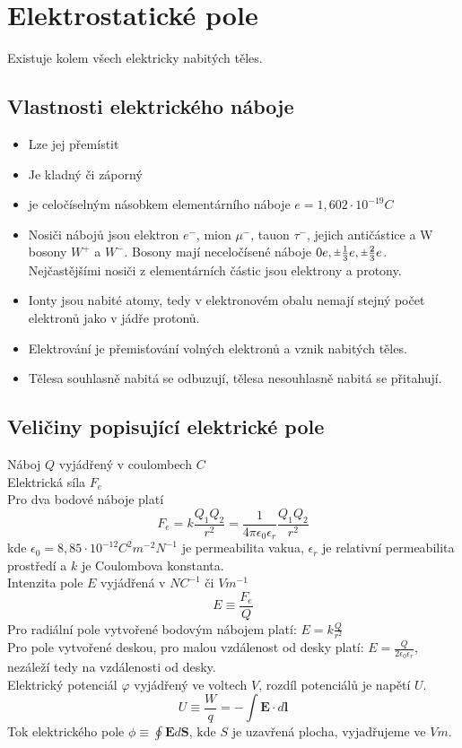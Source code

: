 \documentclass[titlepage]{book}
\newcommand{\rpm}{\sbox0{$1$}\sbox2{$\scriptstyle\pm$}
  \raise\dimexpr(\ht0-\ht2)/2\relax\box2 }
\begin{document}
\chapter{Elektrostatické pole}
Existuje kolem všech elektricky nabitých těles.
\section{Vlastnosti elektrického náboje}
\begin{itemize}
\item Lze jej přemístit
\item Je kladný či záporný
\item je celočíselným násobkem elementárního náboje $e = 1,602 \cdot 10^{-19}C$
\item Nosiči nábojů jsou elektron $e^-$, mion $\mu^-$, tauon $\tau^-$, jejich antičástice a W bosony $W^+$ a $W^-$. Bosony mají neceločísené náboje $0e, \rpm\frac{1}{3}e, \rpm\frac{2}{3}e$. Nejčastějšími nosiči z elementárních částic jsou elektrony a protony.
\item Ionty jsou nabité atomy, tedy v elektronovém obalu nemají stejný počet elektronů jako v jádře protonů.
\item Elektrování je přemisťování volných elektronů a vznik nabitých těles.
\item Tělesa souhlasně nabitá se odbuzují, tělesa nesouhlasně nabitá se přitahují.
\end{itemize}
\section{Veličiny popisující elektrické pole}
Náboj $Q$ vyjádřený v coulombech $C$\\
Elektrická síla $F_e$\\
Pro dva bodové náboje platí\\
\begin{equation}
F_e = k\frac{Q_1Q_2}{r^2} = \frac{1}{4\pi \epsilon_0\epsilon_r}\frac{Q_1Q_2}{r^2}
\end{equation}
kde $\epsilon_0 = 8,85 \cdot 10^{-12} C^2m^{-2}N^{-1}$ je permeabilita vakua, $\epsilon_r$ je relativní permeabilita prostředí a $k$ je Coulombova konstanta.\\
Intenzita pole $E$ vyjádřená v $NC^{-1}$ či $Vm^{-1}$\\
\begin{equation}
E \equiv \frac{F_e}{Q}
\end{equation}
Pro radiální pole vytvořené bodovým nábojem platí: $E = k\frac{Q}{r^2}$\\
Pro pole vytvořené deskou, pro malou vzdálenost od desky platí: $E = \frac{Q}{2\epsilon_0\epsilon_r}$, nezáleží tedy na vzdálenosti od desky.\\
Elektrický potenciál $\varphi$ vyjádřený ve voltech $V$, rozdíl potenciálů je napětí $U$.\\
\begin{equation}
U \equiv \frac{W}{q} = -\int \boldsymbol E \cdot d\boldsymbol l
\end{equation}
Tok elektrického pole $\phi \equiv \oint \boldsymbol E d\boldsymbol S$, kde $S$ je uzavřená plocha, vyjadřujeme ve $Vm$.
\end{document}
